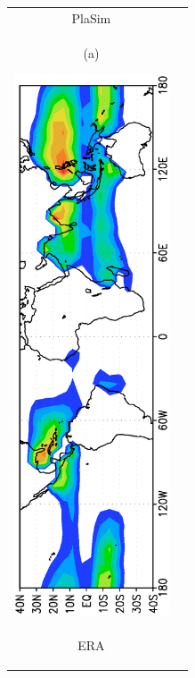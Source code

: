 \documentclass[12pt,a4paper,twoside,openright,headinclude,liststotoc,bibtotoc]{scrreprt}
\begin{document}
\begin{figure}[b]
\begin{tabular}{cc}
\hspace{-0.5cm}PlaSim
\\
\begin{minipage}{1.0\textwidth}
\begin{center}
\begin{scriptsize}(a)\end{scriptsize}\hspace{-1.28cm}\includegraphics[height=16.0cm,angle=-90]{eps/sgpanm.eps}
\end{center}
\end{minipage}
\\
\begin{minipage}{1.0\textwidth}\hspace{7.9cm}ERA\vspace{-0.5cm}
\begin{center}

\end{center}
\end{minipage}
\end{tabular}
\end{figure}
\end{document}
